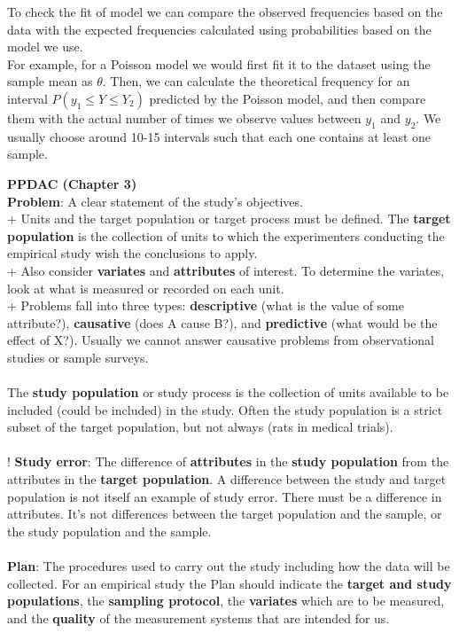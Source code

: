 \documentclass[a4paper,12pt]{article}
\begin{document}
To check the fit of model we can compare the observed frequencies based on the data with the expected frequencies calculated using probabilities based on the model we use.
\\

For example, for a Poisson model we would first fit it to the dataset using the sample mean as $\theta$. Then, we can calculate the theoretical frequency for an interval $P(y_1 \leq Y \leq Y_2)$ predicted by the Poisson model, and then compare them with the actual number of times we observe values between $y_1$ and $y_2$. We usually choose around 10-15 intervals such that each one contains at least one sample.
\newpage

\textbf{PPDAC (Chapter 3)}
\\

\textbf{Problem}: A clear statement of the study’s objectives.
\\ + Units and the target population or target process must be defined. The \textbf{target population} is the collection
of units to which the experimenters conducting the empirical study wish the conclusions to apply. 
\\ + Also consider \textbf{variates} and \textbf{attributes} of interest. To determine the variates, look at what is measured or
recorded on each unit.
\\ + Problems fall into three types: \textbf{descriptive} (what is the value of some attribute?), \textbf{causative} (does A cause B?), and \textbf{predictive} (what would be the effect of X?). Usually we cannot answer causative problems from observational studies or sample surveys.
\\
\\ The \textbf{study population} or study process is the collection
of units available to be included (could be included) in the study. Often the study population is a strict subset of the target population, but not always (rats in medical trials). 
\\
\\ ! \textbf{Study error}: The difference of \textbf{attributes} in the \textbf{study population} from the attributes in the \textbf{target population}. A difference between the study and target
population is not itself an example of study error. There must be a difference in attributes. It's not differences between the target population and the
sample, or the study population and the sample.
\\
\\\textbf{Plan}: The procedures used to carry out the study including how the data will be collected. For an empirical study the Plan should indicate the \textbf{target and
study populations}, the \textbf{sampling protocol}, the \textbf{variates} which are to be measured, and the \textbf{quality} of the measurement systems that are intended for us.
\end{document}
